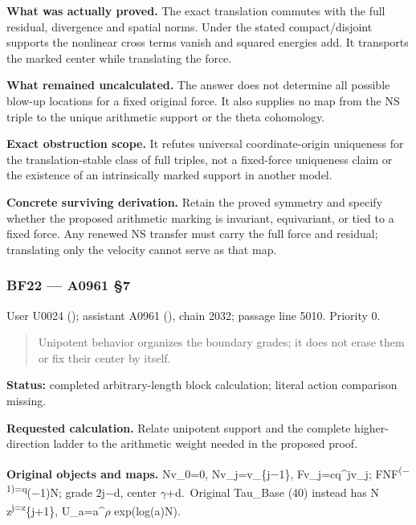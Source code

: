 \textbf{What was actually proved.} The exact translation commutes with
the full residual, divergence and spatial norms. Under the stated
compact/disjoint supports the nonlinear cross terms vanish and squared
energies add. It transports the marked center while translating the
force.

\textbf{What remained uncalculated.} The answer does not determine all
possible blow-up locations for a fixed original force. It also supplies
no map from the NS triple to the unique arithmetic support or the theta
cohomology.

\textbf{Exact obstruction scope.} It refutes universal coordinate-origin
uniqueness for the translation-stable class of full triples, not a
fixed-force uniqueness claim or the existence of an intrinsically marked
support in another model.

\textbf{Concrete surviving derivation.} Retain the proved symmetry and
specify whether the proposed arithmetic marking is invariant,
equivariant, or tied to a fixed force. Any renewed NS transfer must
carry the full force and residual; translating only the velocity cannot
serve as that map.

\subsubsection{BF22 --- A0961 §7}\label{TranscriptLedgerStage:bf22-a0961-7}

User U0024 (\protect{});
assistant A0961 (\protect{}),
chain 2032; passage line 5010. Priority 0.

\begin{quote}
Unipotent behavior organizes the boundary grades; it does not erase them
or fix their center by itself.
\end{quote}

\textbf{Status:} completed arbitrary-length block calculation; literal
action comparison missing.

\textbf{Requested calculation.} Relate unipotent support and the
complete higher-direction ladder to the arithmetic weight needed in the
proposed proof.

\textbf{Original objects and maps.} Nv\_0=0,
Nv\_j=v\_\{j\allowbreak{}\ensuremath{−}\allowbreak{}1\},
Fv\_j=cq\^{}jv\_j;
FNF\textsuperscript{(\allowbreak{}\ensuremath{−}\allowbreak{}1)=q}(\allowbreak{}\ensuremath{−}\allowbreak{}1)N;
grade 2j\allowbreak{}\ensuremath{−}\allowbreak{}d, center
\allowbreak{}\ensuremath{γ}\allowbreak{}+d. Original Tau\_Base (40)
instead has N z\textsuperscript{j=z}\{j+1\},
U\_a=a\textasciicircum{}\allowbreak{}\ensuremath{ρ}\allowbreak{}
exp(log(a)N).

